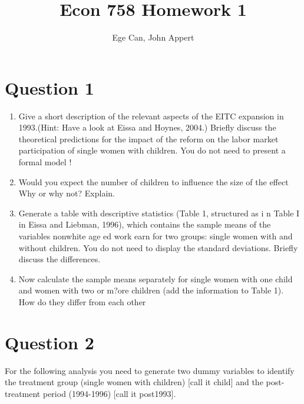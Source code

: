 \documentclass{article}
\begin{document}
\title{Econ 758 Homework 1}
\author{Ege Can, John Appert}
\maketitle

\section{Question 1}

\begin{enumerate}[label=\alph*]
\item Give a short description of the relevant aspects of the EITC expansion in 1993.(Hint: Have a look at Eissa and Hoynes, 2004.) Briefly discuss the theoretical predictions for the impact of the reform on the labor market participation of  single women with children. You do  not need  to present a formal model !

\item Would you expect the number of children to influence the size of the effect Why or why not? Explain.


\item  Generate a table with descriptive statistics (Table 1, structured as i
n Table I in Eissa and Liebman, 1996), which contains the sample means of the variables nonwhite age ed work  earn  for  two groups: single women with and without children. You do not need to display the  standard deviations. Briefly discuss the differences.

\item  Now calculate the sample means separately for single women with one child and women with two or m?ore children (add the information to Table 1). How do they differ from each other

\end{enumerate}

\section{Question 2}

For the following analysis you need to generate two dummy variables to identify the treatment group (single women with children) [call it child] and the post-treatment period (1994-1996) [call it post1993].
\end{document}
